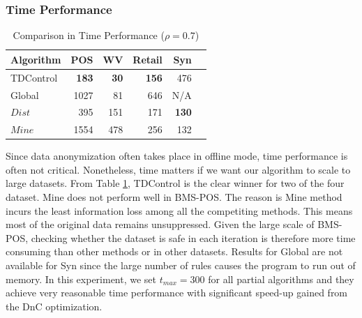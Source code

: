 \subsubsection{Time Performance}\label{sec:eval:time}
\begin{table}[th]
\caption{Comparison in Time Performance ($\rho=0.7$)}
\centering
\begin{tabular}{|l|r|r|r|r|r|}
  \hline
  Algorithm & POS & WV & Retail  &Syn \\  \hline \hline
  TDControl & \bf{183} & \bf{30 }& \bf{156} &   476  \\  \hline
  Global & 1027 & 81 & 646 &   N/A  \\  \hline
  $Dist$ & 395 & 151 & 171 &\bf{130}\\ \hline
  $Mine$ & 1554 & 478& 256 & 132\\ \hline
  \end{tabular}
\label{tab:timeresult}
\end{table}

Since data anonymization often takes place in offline mode,
time performance is often not critical.
Nonetheless, time matters if we want our algorithm to
scale to large datasets.
From Table \ref{tab:timeresult}, TDControl is the clear winner
for two of the four dataset. Mine does not perform well in BMS-POS.
The reason is Mine method incurs the least information loss among all the
competiting methods. This means most of the original data remains
unsuppressed. Given the large scale of BMS-POS, checking whether the
dataset is safe in each iteration is therefore more time consuming than
other methods or in other datasets.
Results for Global are not available for Syn since
the large number of rules causes the program to run out of memory.
In this experiment, we set $t_{max} = 300$ for all partial algorithms  and they achieve
very reasonable time performance with significant speed-up gained from the DnC
optimization.
%

